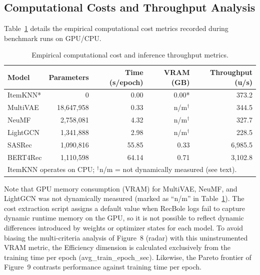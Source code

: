 \documentclass[journal]{IEEEtran}
\begin{document}
\subsection{Computational Costs and Throughput Analysis}
Table~\ref{tab:compute} details the empirical computational cost metrics recorded during benchmark runs on GPU/CPU.

\begin{table}[h]
\centering
\caption{Empirical computational cost and inference throughput metrics.}
\label{tab:compute}
\footnotesize
\setlength{\tabcolsep}{2.5pt}
\begin{tabular}{lrrrr}
\toprule
\textbf{Model} & \textbf{Parameters} & \textbf{Time (s/epoch)} & \textbf{VRAM (GB)} & \textbf{Throughput (u/s)} \\
\midrule
ItemKNN*  & 0          & 0.00 & 0.00* & 373.2 \\
MultiVAE  & 18,647,958 & 0.33 & n/m$^\dagger$  & 344.5 \\
NeuMF     & 2,758,081  & 4.32 & n/m$^\dagger$  & 327.7 \\
LightGCN  & 1,341,888  & 2.98 & n/m$^\dagger$  & 228.5 \\
SASRec    & 1,090,816  & 55.85 & 0.33 & 6,985.5 \\
BERT4Rec  & 1,110,598  & 64.14 & 0.71 & 3,102.8 \\
\bottomrule
\multicolumn{5}{l}{\scriptsize *ItemKNN operates on CPU; $^\dagger$n/m = not dynamically measured (see text).}
\end{tabular}
\end{table}

Note that GPU memory consumption (VRAM) for MultiVAE, NeuMF, and LightGCN was not dynamically measured (marked as ``n/m'' in Table~\ref{tab:compute}). The cost extraction script assigns a default value when RecBole logs fail to capture dynamic runtime memory on the GPU, so it is not possible to reflect dynamic differences introduced by weights or optimizer states for each model. To avoid biasing the multi-criteria analysis of Figure~8 (radar) with this uninstrumented VRAM metric, the Efficiency dimension is calculated exclusively from the training time per epoch (avg\_train\_epoch\_sec). Likewise, the Pareto frontier of Figure~9 contrasts performance against training time per epoch.
\end{document}
